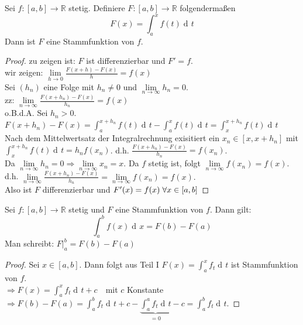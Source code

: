 \documentclass[a4paper,titlepage,oneside]{article}
\def\R{\ensuremath{\mathbb{R}} }
\newcommand{\der}{\operatorname{d\!}{}}
\def\sp{\hspace{0,1cm}}
\renewcommand{\liminf}[2][n]{\ensuremath{\lim\limits_{#1 \rightarrow \infty}{#2}}}
\newcommand{\limnull}[2][n]{\ensuremath{\lim\limits_{#1 \rightarrow 0}{#2}}}
\newcommand{\integral}[4][x]{\ensuremath{\int_{#2}^{#3}{#4\der #1}}}
\newcommand{\intAB}[2][x]{\integral[#1]{a}{b}{#2}}
\theoremstyle{thmstyle}
\begin{document}
\begin{prop}
Sei $f: [a,b] \to \R$ stetig. Definiere $F: [a,b] \to \R$ folgendermaßen 
\[F(x) = \int_{a}^{x}{f(t)\der t}\]
Dann ist $F$ eine Stammfunktion von $f$.
\begin{proof}
zu zeigen ist: $F$ ist differenzierbar und $F' = f$.\\
wir zeigen: $\limnull[h]{\frac{F(x+h) - F(x)}{h}} = f(x)$\\
Sei $(h_n)$ eine Folge mit $h_n \ne 0$ und $\liminf{h_n} = 0.$\\
zz: $ \liminf{\frac{F(x+h_n) - F(x)}{h_n}} = f(x)$\\
o.B.d.A. Sei $h_n > 0$.\\
$F(x+h_n) - F(x) = \int_{a}^{x+h_n}{f(t)\der t} - \int_{a}^{x}{f(t)\der t} = \int_{x}^{x+h_n}{f(t)\der t}$\\
Nach dem Mittelwertsatz der Integralrechnung exisitiert ein $x_n \in [x, x+ h_n]$ mit $\int_{x}^{x+h_n}{f(t)\der t} = h_n f(x_n)$.
d.h. $\frac{F(x+h_n) - F(x)}{h_n} = f(x_n)$.\\
Da $ \liminf{h_n} = 0 \Rightarrow \liminf{x_n} = x.$ Da $f$ stetig ist, folgt $\liminf{f(x_n)} = f(x)$. d.h. $\liminf{\frac{F(x+h_n) - F(x)}{h_n}} = \liminf{f(x_n)} = f(x).$\\
Also ist $F$ differenzierbar und $F'(x) = f(x) \sp \forall x \in [a,b]$ 
\end{proof}
\end{prop}

\begin{satz}
Sei $f: [a,b] \to \R$ stetig und $F$ eine Stammfunktion von $f$. Dann gilt: \[ \intAB{f(x)} = F(b) - F(a)\]
Man schreibt: $F|_a^b = F(b) - F(a)$
\begin{proof}
Sei $x \in [a,b]$. Dann folgt aus Teil I $F(x) = \int_{a}^{x}{f_t \der t}$ ist Stammfunktion von $f$.\\
$\Rightarrow F(x) = \int_{a}^{x}{f_t \der t} + c \quad $mit $c$ Konstante\\
$\Rightarrow F(b) - F(a) = \int_{a}^{b}{f_t \der t} + c - \underbrace{\int_{a}^{a}{f_t \der t}}_{= 0} - c = \int_{a}^{b}{f_t \der t}$.
\end{proof}
\end{satz}
\end{document}
